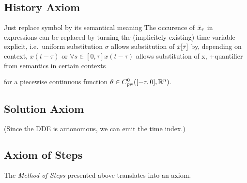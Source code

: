\documentclass[10pt]{report}
\begin{document}


        \subsection{History Axiom}
            \label{history-axiom}

            Just replace symbol by its semantical meaning
            The occurence of $\bar{x}_{\tau}$ in expressions can be replaced by turning the (implicitely existing) time variable explicit, i.e.\
            uniform substitution $\sigma$
            allows substitution of $x[\tau]$ by, depending on context, $x(t-\tau)$ or $\forall{s\in[0,\tau]}{x(t-\tau)}$
            allows substitution of x, +quantifier from semantics in certain contexts
            \begin{calculus}
            \end{calculus}
            for a piecewise continuous function $\theta\in\statespace$.

        \subsection{Solution Axiom}
            \label{sec:solution-axiom}

            (Since the DDE is autonomous, we can emit the time index.)


        \subsection{Axiom of Steps}
            \label{sec:axiom-of-steps}

            The \emph{Method of Steps} presented above translates into an axiom.
\end{document}
